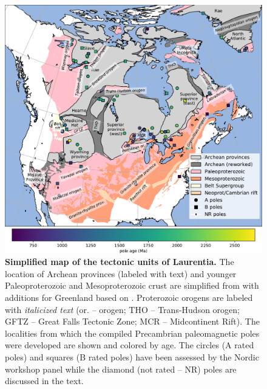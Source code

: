 \documentclass[twocolumn, switch]{article} %
\begin{document}
\begin{figure}
\centering
\includegraphics[width=\textwidth]{../Figures/Fig1_map.pdf}
\caption{\textbf{Simplified map of the tectonic units of Laurentia.} The location of Archean provinces (labeled with text) and younger Paleoproterozoic and Mesoproterozoic crust are simplified from \cite{Whitmeyer2007a} with additions for Greenland based on \cite{St-Onge2009a}. Proterozoic orogens are labeled with \textit{italicized text} (or. -- orogen; THO  -- Trans-Hudson orogen; GFTZ -- Great Falls Tectonic Zone; MCR -- Midcontinent Rift). The localities from which the compiled Precambrian paleomagnetic poles were developed are shown and colored by age. The circles (A rated poles) and squares (B rated poles) have been assessed by the Nordic workshop panel \citep{Evans2021a} while the diamond (not rated -- NR) poles are discussed in the text.}
\label{fig:Laurentia_map}
\end{figure}
\end{document}
